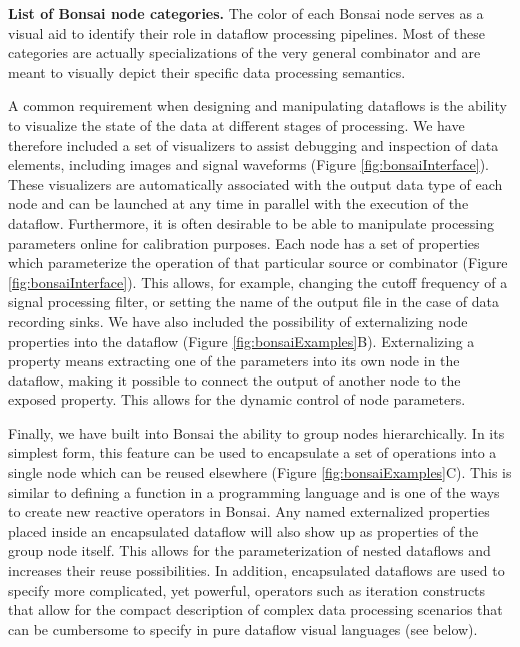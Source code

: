 \begin{table}
\begin{center}
\scalebox{0.7}{}
\end{center}
\vspace{-5mm}
\caption{\textbf{List of Bonsai node categories.} The color of each Bonsai node serves as a visual aid to identify their role in dataflow processing pipelines. Most of these categories are actually specializations of the very general combinator and are meant to visually depict their specific data processing semantics.}
\label{tab:bonsaiCategories}
\end{table}

A common requirement when designing and manipulating dataflows is the ability to visualize the state of the data at different stages of processing. We have therefore included a set of visualizers to assist debugging and inspection of data elements, including images and signal waveforms (Figure \ref{fig:bonsaiInterface}). These visualizers are automatically associated with the output data type of each node and can be launched at any time in parallel with the execution of the dataflow. Furthermore, it is often desirable to be able to manipulate processing parameters online for calibration purposes. Each node has a set of properties which parameterize the operation of that particular source or combinator (Figure \ref{fig:bonsaiInterface}). This allows, for example, changing the cutoff frequency of a signal processing filter, or setting the name of the output file in the case of data recording sinks. We have also included the possibility of externalizing node properties into the dataflow (Figure \ref{fig:bonsaiExamples}B). Externalizing a property means extracting one of the parameters into its own node in the dataflow, making it possible to connect the output of another node to the exposed property. This allows for the dynamic control of node parameters.

Finally, we have built into Bonsai the ability to group nodes hierarchically. In its simplest form, this feature can be used to encapsulate a set of operations into a single node which can be reused elsewhere (Figure \ref{fig:bonsaiExamples}C). This is similar to defining a function in a programming language and is one of the ways to create new reactive operators in Bonsai. Any named externalized properties placed inside an encapsulated dataflow will also show up as properties of the group node itself. This allows for the parameterization of nested dataflows and increases their reuse possibilities. In addition, encapsulated dataflows are used to specify more complicated, yet powerful, operators such as iteration constructs that allow for the compact description of complex data processing scenarios that can be cumbersome to specify in pure dataflow visual languages \cite{Mosconi2000} (see below).


